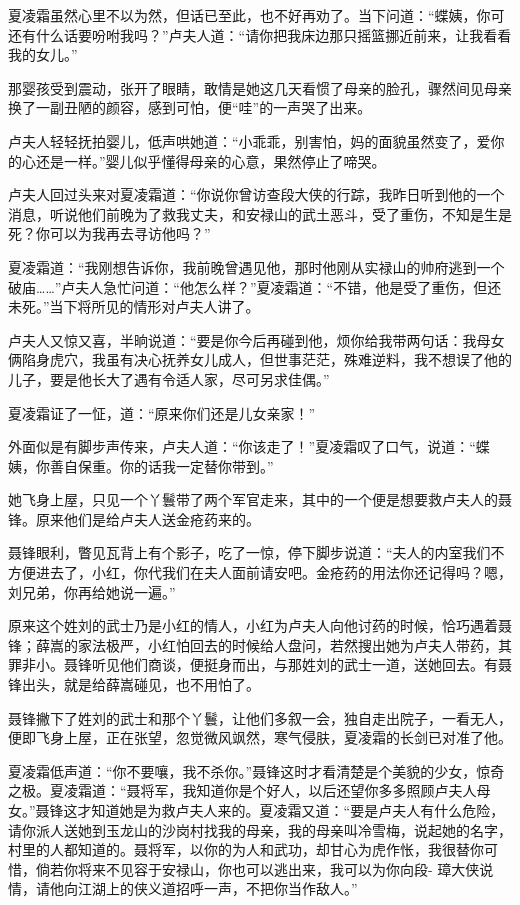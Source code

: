 \documentclass[12pt,oneside]{book}
\begin{document}
夏凌霜虽然心里不以为然，但话已至此，也不好再劝了。当下问道：``蝶姨，你可还有什么话要吩咐我吗？''卢夫人道：``请你把我床边那只摇篮挪近前来，让我看看我的女儿。''

那婴孩受到震动，张开了眼睛，敢情是她这几天看惯了母亲的脸孔，骤然间见母亲换了一副丑陋的颜容，感到可怕，便``哇''的一声哭了出来。

卢夫人轻轻抚拍婴儿，低声哄她道：``小乖乖，别害怕，妈的面貌虽然变了，爱你的心还是一样。''婴儿似乎懂得母亲的心意，果然停止了啼哭。

卢夫人回过头来对夏凌霜道：``你说你曾访查段大侠的行踪，我昨日听到他的一个消息，听说他们前晚为了救我丈夫，和安禄山的武土恶斗，受了重伤，不知是生是死？你可以为我再去寻访他吗？''

夏凌霜道：``我刚想告诉你，我前晚曾遇见他，那时他刚从实禄山的帅府逃到一个破庙\ldots\ldots{}''卢夫人急忙问道：``他怎么样？''夏凌霜道：``不错，他是受了重伤，但还未死。''当下将所见的情形对卢夫人讲了。

卢夫人又惊又喜，半晌说道：``要是你今后再碰到他，烦你给我带两句话：我母女俩陷身虎穴，我虽有决心抚养女儿成人，但世事茫茫，殊难逆料，我不想误了他的儿子，要是他长大了遇有令适人家，尽可另求佳偶。''

夏凌霜证了一怔，道：``原来你们还是儿女亲家！''

外面似是有脚步声传来，卢夫人道：``你该走了！''夏凌霜叹了口气，说道：``蝶姨，你善自保重。你的话我一定替你带到。''

她飞身上屋，只见一个丫鬟带了两个军官走来，其中的一个便是想要救卢夫人的聂锋。原来他们是给卢夫人送金疮药来的。

聂锋眼利，瞥见瓦背上有个影子，吃了一惊，停下脚步说道：``夫人的内室我们不方便进去了，小红，你代我们在夫人面前请安吧。金疮药的用法你还记得吗？嗯，刘兄弟，你再给她说一遍。''

原来这个姓刘的武士乃是小红的情人，小红为卢夫人向他讨药的时候，恰巧遇着聂锋；薛嵩的家法极严，小红怕回去的时候给人盘问，若然搜出她为卢夫人带药，其罪非小。聂锋听见他们商谈，便挺身而出，与那姓刘的武士一道，送她回去。有聂锋出头，就是给薛嵩碰见，也不用怕了。

聂锋撇下了姓刘的武士和那个丫鬟，让他们多叙一会，独自走出院子，一看无人，便即飞身上屋，正在张望，忽觉微风飒然，寒气侵肤，夏凌霜的长剑已对准了他。

夏凌霜低声道：``你不要嚷，我不杀你。''聂锋这时才看清楚是个美貌的少女，惊奇之极。夏凌霜道：``聂将军，我知道你是个好人，以后还望你多多照顾卢夫人母女。''聂锋这才知道她是为救卢夫人来的。夏凌霜又道：``要是卢夫人有什么危险，请你派人送她到玉龙山的沙岗村找我的母亲，我的母亲叫冷雪梅，说起她的名字，村里的人都知道的。聂将军，以你的为人和武功，却甘心为虎作怅，我很替你可惜，倘若你将来不见容于安禄山，你也可以逃出来，我可以为你向段-
璋大侠说情，请他向江湖上的侠义道招呼一声，不把你当作敌人。''
\end{document}
